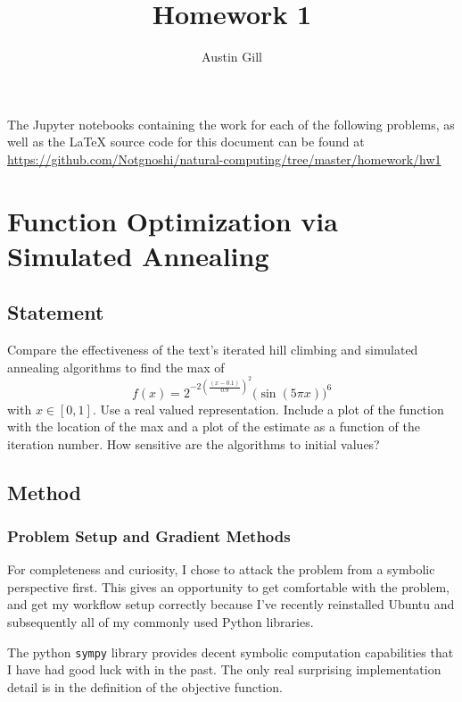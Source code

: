 \documentclass{article}
\title{Homework 1}
\author{Austin Gill}
\begin{document}
\maketitle
\begingroup
\hypersetup{linkcolor=black}
\tableofcontents
\listoftodos
\endgroup
\newpage

The Jupyter notebooks containing the work for each of the following problems, as well as the
\LaTeX{} source code for this document can be found at
\url{https://github.com/Notgnoshi/natural-computing/tree/master/homework/hw1}

\section{Function Optimization via Simulated Annealing}\label{prob:1}

\subsection{Statement}
Compare the effectiveness of the text's iterated hill climbing and simulated annealing algorithms
to find the max of
\[ f(x) = 2^{-2{\left(\frac{(x - 0.1)}{0.9}\right)}^2}{\big(\sin(5\pi x)\big)}^6\]
with $x\in [0,1]$. Use a real valued representation. Include a plot of the function with the
location of the max and a plot of the estimate as a function of the iteration number. How sensitive
are the algorithms to initial values?

\subsection{Method}

\subsubsection{Problem Setup and Gradient Methods}

For completeness and curiosity, I chose to attack the problem from a symbolic perspective first.
This gives an opportunity to get comfortable with the problem, and get my workflow setup correctly
because I've recently reinstalled Ubuntu and subsequently all of my commonly used Python libraries.

The python \texttt{sympy} library provides decent symbolic computation capabilities
that I have had good luck with in the past. The only real surprising implementation detail is in
the definition of the objective function.
\end{document}
